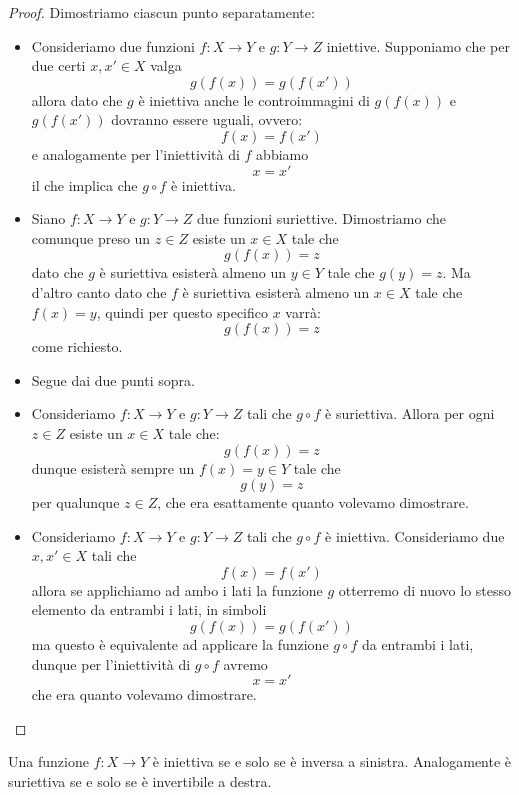 \documentclass[11pt]{scrartcl}
\begin{document}
	\begin{proof}
		Dimostriamo ciascun punto separatamente: 
		\begin{itemize}
			\item[1.] Consideriamo due funzioni $f:X\to Y$ e $g:Y\to Z$ iniettive. Supponiamo che per due certi $x,x'\in X$ valga
			$$g(f(x))=g(f(x'))$$
			allora dato che $g$ è iniettiva anche le controimmagini di $g(f(x))$ e $g(f(x'))$ dovranno essere uguali, ovvero:
			$$f(x)=f(x')$$ 
			e analogamente per l'iniettività di $f$ abbiamo
			$$x=x'$$
			il che implica che $g \circ f$ è iniettiva.
			\item[2.] Siano $f:X\to Y$ e $g:Y\to Z$ due funzioni suriettive. Dimostriamo che comunque preso un $z\in Z$ esiste un $x\in X$ tale che 
			$$g(f(x))=z$$
			dato che $g$ è suriettiva esisterà almeno un $y\in Y$ tale che $g(y)=z$. Ma d'altro canto dato che $f$ è suriettiva esisterà almeno un $x\in X$ tale che $f(x)=y$, quindi per questo specifico $x$ varrà:
			$$g(f(x))=z$$
			come richiesto.
			\item[3.] Segue dai due punti sopra.
			\item[4.] Consideriamo $f:X\to Y$ e $g:Y\to Z$ tali che $g\circ f$ è suriettiva. Allora per ogni $z\in Z$ esiste un $x\in X$ tale che:
			$$g(f(x))=z$$
			dunque esisterà sempre un $f(x)=y\in Y$ tale che
			$$g(y)=z$$
			per qualunque $z\in Z$, che era esattamente quanto volevamo dimostrare.  
			\item[5.] Consideriamo $f:X\to Y$ e $g:Y\to Z$ tali che $g\circ f$ è iniettiva. Consideriamo due $x,x'\in X$ tali che 
			$$f(x)=f(x')$$
			allora se applichiamo ad ambo i lati la funzione $g$ otterremo di nuovo lo stesso elemento da entrambi i lati, in simboli
			$$g(f(x))=g(f(x'))$$
			ma questo è equivalente ad applicare la funzione $g\circ f$ da entrambi i lati, dunque per l'iniettività di $g\circ f$ avremo
			$$x=x'$$
			che era quanto volevamo dimostrare.
		\end{itemize}
	\end{proof}
	
	\begin{lemma}
		Una funzione $f:X\to Y$ è iniettiva se e solo se è inversa a sinistra. Analogamente è suriettiva se e solo se è invertibile a destra.
	\end{lemma}
	
\end{document}
